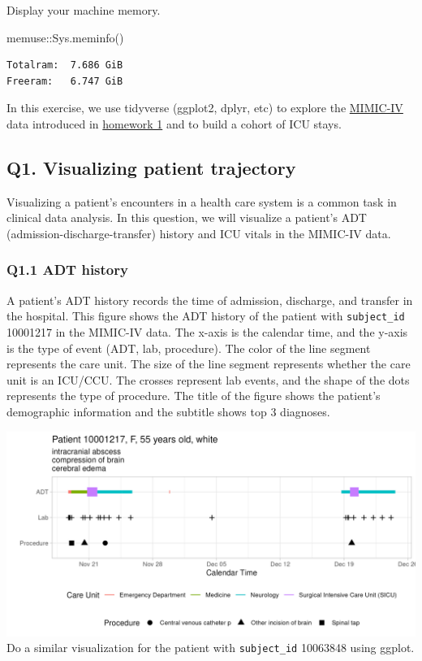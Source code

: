 \documentclass[
]{article}
\newenvironment{Shaded}{\begin{snugshade}}{\end{snugshade}}
\newcommand{\FunctionTok}[1]{\textcolor[rgb]{0.00,0.00,0.00}{#1}}
\newcommand{\NormalTok}[1]{\textcolor[rgb]{0.00,0.00,0.00}{#1}}
\newcommand{\SpecialCharTok}[1]{\textcolor[rgb]{0.00,0.00,0.00}{#1}}
\begin{document}
Display your machine memory.

\begin{Shaded}
\begin{Highlighting}[]
\NormalTok{memuse}\SpecialCharTok{::}\FunctionTok{Sys.meminfo}\NormalTok{()}
\end{Highlighting}
\end{Shaded}

\begin{verbatim}
Totalram:  7.686 GiB 
Freeram:   6.747 GiB 
\end{verbatim}

In this exercise, we use tidyverse (ggplot2, dplyr, etc) to explore the
\href{https://physionet.org/content/mimiciv/3.1/}{MIMIC-IV} data
introduced in
\href{https://ucla-biostat-203b.github.io/2025winter/hw/hw1/hw1.html}{homework
1} and to build a cohort of ICU stays.

\hypertarget{q1.-visualizing-patient-trajectory}{%
\subsection{Q1. Visualizing patient
trajectory}\label{q1.-visualizing-patient-trajectory}}

Visualizing a patient's encounters in a health care system is a common
task in clinical data analysis. In this question, we will visualize a
patient's ADT (admission-discharge-transfer) history and ICU vitals in
the MIMIC-IV data.

\hypertarget{q1.1-adt-history}{%
\subsubsection{Q1.1 ADT history}\label{q1.1-adt-history}}

A patient's ADT history records the time of admission, discharge, and
transfer in the hospital. This figure shows the ADT history of the
patient with \texttt{subject\_id} 10001217 in the MIMIC-IV data. The
x-axis is the calendar time, and the y-axis is the type of event (ADT,
lab, procedure). The color of the line segment represents the care unit.
The size of the line segment represents whether the care unit is an
ICU/CCU. The crosses represent lab events, and the shape of the dots
represents the type of procedure. The title of the figure shows the
patient's demographic information and the subtitle shows top 3
diagnoses.

\includegraphics{images/10001217_adt.png} Do a similar visualization for
the patient with \texttt{subject\_id} 10063848 using ggplot.
\end{document}
